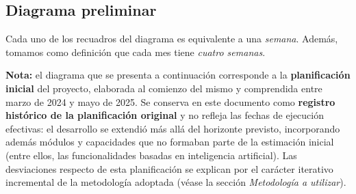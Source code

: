 \documentclass[a4paper,12pt]{article}
\begin{document}
    \subsection{Diagrama preliminar}
    \par Cada uno de los recuadros del diagrama es equivalente a una \textit{semana}. Además, tomamos como definición que cada mes tiene \textit{cuatro semanas}.
    \par \textbf{Nota:} el diagrama que se presenta a continuación corresponde a la \textbf{planificación inicial} del proyecto, elaborada al comienzo del mismo y comprendida entre marzo de 2024 y mayo de 2025. Se conserva en este documento como \textbf{registro histórico de la planificación original} y no refleja las fechas de ejecución efectivas: el desarrollo se extendió más allá del horizonte previsto, incorporando además módulos y capacidades que no formaban parte de la estimación inicial (entre ellos, las funcionalidades basadas en inteligencia artificial). Las desviaciones respecto de esta planificación se explican por el carácter iterativo incremental de la metodología adoptada (véase la sección \textit{Metodología a utilizar}).
    
\end{document}
